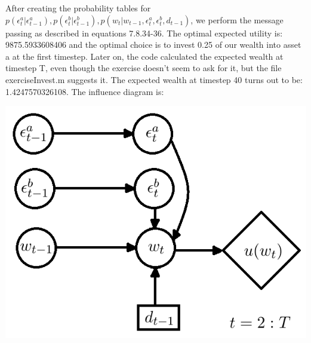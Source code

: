 \documentclass[11pt,a4paper,oneside]{report}
\begin{document}
After creating the probability tables for $p(\epsilon_t^a|\epsilon_{t-1}^a),p(\epsilon_t^b|\epsilon_{t-1}^b),p(w_t|w_{t-1},\epsilon_t^a,\epsilon_t^b,d_{t-1})$, we perform the message passing as described in equations 7.8.34-36. The optimal expected utility is: 9875.5933608406 and the optimal choice is to invest 0.25 of our wealth into asset a at the first timestep. Later on, the code calculated the expected wealth at timestep T, even though the exercise doesn't seem to ask for it, but the file exerciseInvest.m suggests it. The expected wealth at timestep 40 turns out to be: 1.4247570326108. The influence diagram is:\\
	\begin{center} \includegraphics[width=1\textwidth]{c7e13influencediagram}\end{center}
	
\end{document}
